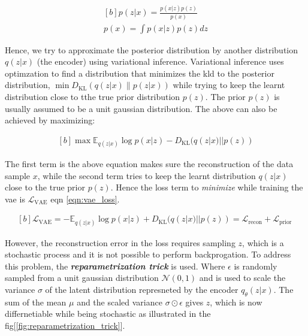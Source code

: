 \begin{equation}\label{eqn:pofx}
    \begin{gathered}[b]
        p(z | x)=\frac{p(x | z) p(z)}{p(x)} \\
        p(x)=\int p(x | z) p(z) dz
    \end{gathered}
\end{equation}

Hence, we try to approximate the posterior distribution by another distribution $q(z|x)$ (the encoder) using variational inference. Variational inference uses optimzation to find a distribution that minimizes the \ac{kld} to the posterior distribution, $\min D_{\mathrm{KL}}(q(z| x) \| p(z| x))$ while trying to keep the learnt distribution close to tthe true prior distribution $p(z)$\cite{variational_inference}. The prior $p(z)$ is usually assumed to be a unit gaussian distribution. The above can also be achieved by maximizing:

\begin{equation} \label{eqn:minKLd}
    \begin{gathered}[b]
        \max \mathbb{E}_{q(z | x)} \log p(x | z) - D_{\mathrm{KL}}(q(z | x) || p(z))
    \end{gathered}
\end{equation}

The first term is the above equation makes sure the reconstruction of the data sample $x$, while the second term tries to keep the learnt distribution $q(z|x)$ close to the true prior $p(z)$. Hence the loss term to \textit{minimize} while training the vae is $\mathcal{L}_{\mathrm{VAE}}$ eqn \ref{eqn:vae_loss}.

\begin{equation} \label{eqn:vae_loss}
    \begin{gathered}[b]
        \mathcal{L}_{\mathrm{VAE}}=-\mathbb{E}_{q(z | x)} \log p(x | z) + D_{\mathrm{KL}}(q(z | x) || p(z)) =\mathcal{L}_{\text {recon}} +\mathcal{L}_{\text {prior }}
    \end{gathered}
\end{equation}

However, the reconstruction error in the loss requires sampling $z$, which is a stochastic process and it is not possible to perform backprogation. To address this problem, the \textbf{\textit{reparametrization trick}} is used. Where $\epsilon$ is randomly sampled from a unit gaussian distribution $\mathcal{N}(0,1)$ and is used to scale the variance $\sigma$ of the latent distribution represneted by the encoder $q_{\theta}(z|x)$. The sum of the mean $\mu$ and the scaled variance $\sigma \odot \epsilon$ gives $z$, which is now differnetiable while being stochastic as illustrated in the fig[\ref{fig:reparametrization_trick}].

